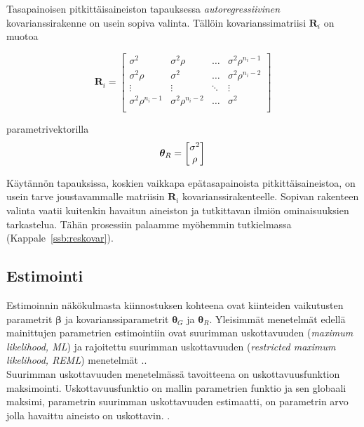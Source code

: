 \documentclass[finnish]{docopts}
\begin{document}
Tasapainoisen pitkittäisaineiston tapauksessa \textit{autoregressiivinen} kovarianssirakenne on usein sopiva valinta. Tällöin kovarianssimatriisi $\bm{R}_i$ on muotoa

$$
\bm{R}_i =
\begin{bmatrix}
\sigma^2 & \sigma^2 \rho & \dots  & \sigma^2 \rho^{n_i -1} \\
\sigma^2 \rho   & \sigma^2      & \dots & \sigma^2 \rho^{n_i -2} \\
\vdots   & \vdots        & \ddots & \vdots \\
\sigma^2 \rho^{n_i -1} & \sigma^2 \rho^{n_i -2} & \dots & \sigma^2 \\
\end{bmatrix}
$$

parametrivektorilla \\

$$
\bm{\theta}_R =
\begin{bmatrix}
\sigma^2\\
\rho \\
\end{bmatrix}\\
$$

Käytännön tapauksissa, koskien vaikkapa epätasapainoista pitkittäisaineistoa, on usein tarve joustavammalle matriisin $\bm{R}_i$ kovarianssirakenteelle. Sopivan rakenteen valinta vaatii kuitenkin havaitun aineiston ja tutkittavan ilmiön ominaisuuksien tarkastelua. Tähän prosessiin palaamme myöhemmin tutkielmassa (Kappale~\ref{ssb:reskovar}).\\

\subsection{Estimointi}
\label{sub:estimointi}

Estimoinnin näkökulmasta kiinnostuksen kohteena ovat kiinteiden vaikutusten parametrit $\bm{\beta}$ ja kovarianssiparametrit $\bm{\theta}_G$ ja $\bm{\theta}_R$. Yleisimmät menetelmät edellä mainittujen parametrien estimointiin ovat suurimman uskottavuuden (\textit{maximum likelihood, ML}) ja rajoitettu suurimman uskottavuuden (\textit{restricted maximum likelihood, REML}) menetelmät .\citep{west14}. \\

Suurimman uskottavuuden menetelmässä tavoitteena on uskottavuusfunktion maksimointi. Uskottavuusfunktio on mallin parametrien funktio ja sen globaali maksimi, parametrin suurimman uskottavuuden estimaatti, on parametrin arvo jolla havaittu aineisto on uskottavin. \citep{casella02}. \\
\end{document}
